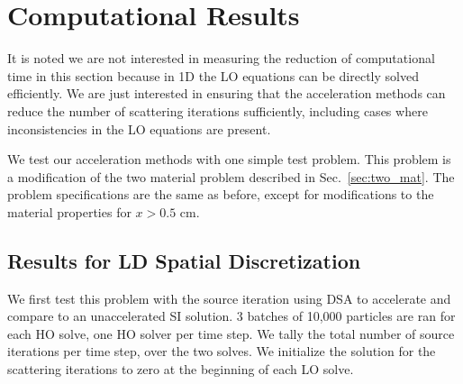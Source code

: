 \section{Computational Results}

It is noted we are not interested in measuring the reduction of
computational time in this section because in 1D the LO equations can be directly solved efficiently.
We are just interested in ensuring that the acceleration methods can reduce the
number of scattering iterations sufficiently, including cases where inconsistencies
in the LO equations are present.

We test our acceleration methods with one simple test
problem.  This problem is a modification of the two material problem described in
Sec.~\ref{sec:two_mat}. The problem specifications are the same as before, except for
modifications to the material properties for $x>0.5$ cm.  

\subsection{Results for LD Spatial Discretization}

We first test this problem with the source iteration using DSA to accelerate and compare
to an unaccelerated SI solution.  3 batches of 10,000 particles are ran for each HO
solve, one HO solver per time step.  We tally the total number of source iterations per
time step, over the two solves.  We initialize the solution for the scattering iterations to zero at the beginning of
each LO solve. 







